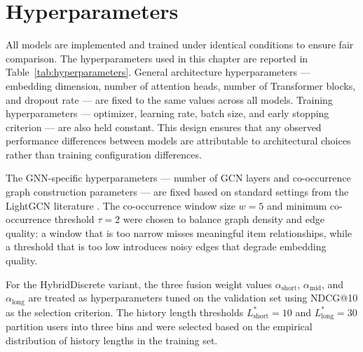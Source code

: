 \documentclass[12pt,a4paper]{report}
\begin{document}
\section{Hyperparameters}
\label{sec:hyperparameters}

All models are implemented and trained under identical conditions to ensure
fair comparison. The hyperparameters used in this chapter are reported in
Table~\ref{tab:hyperparameters}. General architecture hyperparameters ---
embedding dimension, number of attention heads, number of Transformer blocks,
and dropout rate --- are fixed to the same values across all models. Training
hyperparameters --- optimizer, learning rate, batch size, and early stopping
criterion --- are also held constant. This design ensures that any observed
performance differences between models are attributable to architectural
choices rather than training configuration differences.

The GNN-specific hyperparameters --- number of GCN layers and co-occurrence
graph construction parameters --- are fixed based on standard settings from
the LightGCN literature \citep{he2020lightgcn}. The co-occurrence window size
\(w = 5\) and minimum co-occurrence threshold \(\tau = 2\) were chosen to
balance graph density and edge quality: a window that is too narrow misses
meaningful item relationships, while a threshold that is too low introduces
noisy edges that degrade embedding quality.

For the HybridDiscrete variant, the three fusion weight values
\(\alpha_{\text{short}}\), \(\alpha_{\text{mid}}\), and \(\alpha_{\text{long}}\)
are treated as hyperparameters tuned on the validation set using
NDCG@10 as the selection criterion. The history length thresholds
\(L^*_{\text{short}} = 10\) and \(L^*_{\text{long}} = 30\) partition users
into three bins and were selected based on the empirical distribution of
history lengths in the training set.
\end{document}
